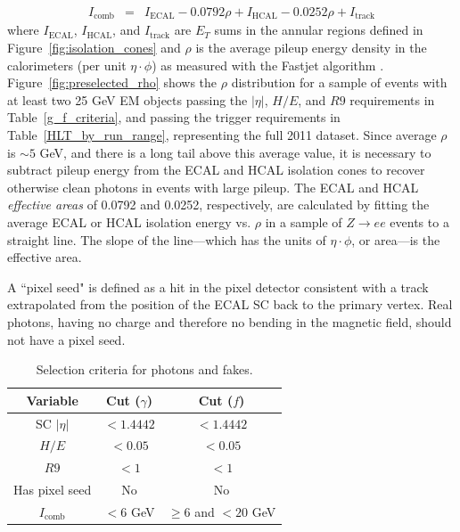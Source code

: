 \documentclass[dissertation.tex]{subfiles}
\begin{document}
\begin{eqnarray}
I_{\mathrm{comb}} &=& I_{\mathrm{ECAL}} - 0.0792\rho + I_{\mathrm{HCAL}} - 0.0252\rho + I_{\mathrm{track}}
\end{eqnarray}
%
where $I_{\mathrm{ECAL}}$, $I_{\mathrm{HCAL}}$, and $I_{\mathrm{track}}$ are $E_{T}$ sums in the annular regions defined in Figure~\ref{fig:isolation_cones} and $\rho$ is the average pileup energy density in the calorimeters (per unit $\eta\cdot\phi$) as measured with the Fastjet algorithm \cite{Fastjet_conf_proceedings, Fastjet_manual}.  Figure~\ref{fig:preselected_rho} shows the $\rho$ distribution for a sample of events with at least two 25 GeV EM objects passing the $|\eta|$, $H/E$, and $R9$ requirements in Table~\ref{g_f_criteria}, and passing the trigger requirements in Table~\ref{HLT_by_run_range}, representing the full 2011 dataset.  Since average $\rho$ is $\sim 5$ GeV, and there is a long tail above this average value, it is necessary to subtract pileup energy from the ECAL and HCAL isolation cones to recover otherwise clean photons in events with large pileup.  The ECAL and HCAL \textit{effective areas} of 0.0792 and 0.0252, respectively, are calculated by fitting the average ECAL or HCAL isolation energy vs. $\rho$ in a sample of $Z\rightarrow ee$ events to a straight line.  The slope of the line---which has the units of $\eta\cdot\phi$, or area---is the effective area.

A ``pixel seed" is defined as a hit in the pixel detector consistent with a track extrapolated from the position of the ECAL SC back to the primary vertex.  Real photons, having no charge and therefore no bending in the magnetic field, should not have a pixel seed.

\begin{table}[hcbp]
\caption{Selection criteria for photons and fakes.}
\centering
\begin{tabular}{|c|c|c|}
\hline
Variable & Cut ($\gamma$) & Cut ($\mathit{f}$) \\
\hline
\hline
SC $|\eta|$ & $< 1.4442$ & $<1.4442$ \\
\hline
$H/E$ & $<0.05$ & $<0.05$ \\
\hline
$R9$ & $< 1$ & $< 1$ \\
\hline
Has pixel seed & No & No \\
\hline
$I_{\mathrm{comb}}$ & $< 6$ GeV & $\geq 6$ and $< 20$ GeV \\
\hline
\end{tabular}
\label{tab:g_f_criteria}
\end{table}
\end{document}
